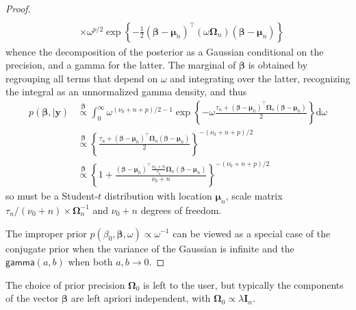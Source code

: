 \documentclass[
  11pt,
  letterpaper,
]{scrbook}
\theoremstyle{definition}
\theoremstyle{definition}
\theoremstyle{definition}
\theoremstyle{plain}
\theoremstyle{plain}
\theoremstyle{plain}
\theoremstyle{remark}
\begin{document}
\begin{proof}
\begin{align*}
   \\& \times \omega^{p/2}\exp\left\{-\frac{1}{2}(\boldsymbol{\beta} - \boldsymbol{\mu}_n)^\top(\omega\mathbf{\Omega}_n)(\boldsymbol{\beta} - \boldsymbol{\mu}_n)\right\}
\end{align*} whence the decomposition of the posterior as a Gaussian
conditional on the precision, and a gamma for the latter. The marginal
of \(\boldsymbol{\beta}\) is obtained by regrouping all terms that
depend on \(\omega\) and integrating over the latter, recognizing the
integral as an unnormalized gamma density, and thus \begin{align*}
 p(\boldsymbol{\beta}, \mid \boldsymbol{y}) & \stackrel{\boldsymbol{\beta}}{\propto} \int_0^\infty \omega^{(\nu_0 + n + p)/2 -1}\exp\left\{- \omega \frac{\tau_n +(\boldsymbol{\beta} - \boldsymbol{\mu}_n)^\top\mathbf{\Omega}_n(\boldsymbol{\beta} - \boldsymbol{\mu}_n)}{2}\right\} \mathrm{d} \omega
 \\&\stackrel{\boldsymbol{\beta}}{\propto} \left\{\frac{\tau_n +(\boldsymbol{\beta} - \boldsymbol{\mu}_n)^\top\mathbf{\Omega}_n(\boldsymbol{\beta} - \boldsymbol{\mu}_n)}{2}\right\}^{-(\nu_0 + n + p)/2}
 \\& \stackrel{\boldsymbol{\beta}}{\propto} \left\{1 + \frac{(\boldsymbol{\beta} - \boldsymbol{\mu}_n)^\top\frac{\nu_0 + n}{\tau_n}\mathbf{\Omega}_n(\boldsymbol{\beta} - \boldsymbol{\mu}_n)}{\nu_0 + n}\right\}^{-(\nu_0 + n + p)/2}
\end{align*} so must be a Student-\(t\) distribution with location
\(\boldsymbol{\mu}_n\), scale matrix
\(\tau_n/(\nu_0+n) \times \mathbf{\Omega}_n^{-1}\) and \(\nu_0+n\)
degrees of freedom.

The improper prior
\(p(\beta_0, \boldsymbol{\beta}, \omega) \propto \omega^{-1}\) can be
viewed as a special case of the conjugate prior when the variance of the
Gaussian is infinite and the \(\mathsf{gamma}(a,b)\) when both
\(a, b \to 0.\)
\end{proof}

The choice of prior precision \(\boldsymbol{\Omega}_0\) is left to the
user, but typically the components of the vector \(\boldsymbol{\beta}\)
are left apriori independent, with
\(\boldsymbol{\Omega}_0 \propto \lambda\mathbf{I}_n\).
\end{document}
